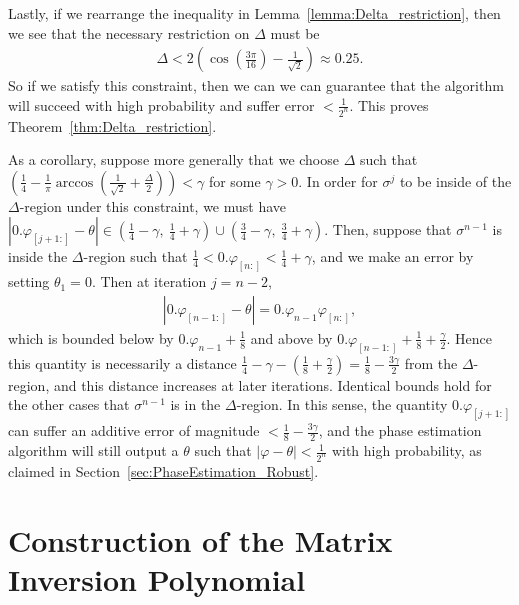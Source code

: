 \documentclass[aps,pra,showpacs,notitlepage,twocolumn,superscriptaddress,nofootinbib]{revtex4-1}
\begin{document}
Lastly, if we rearrange the inequality in Lemma~\ref{lemma:Delta_restriction}, then we see that the necessary restriction on $\Delta$ must be 
\begin{equation}
\begin{gathered}
    \Delta < 2\left(\cos(\frac{3\pi}{16}) - \frac{1}{\sqrt{2}} \right) \approx 0.25.
\end{gathered}
\end{equation}
So if we satisfy this constraint, then we can we can guarantee that the algorithm will succeed with high probability and suffer error $< \frac{1}{2^n}$. This proves Theorem~\ref{thm:Delta_restriction}.


As a corollary, suppose more generally that we choose $\Delta$ such that $\left( \frac{1}{4} - \frac{1}{\pi}\arccos( \frac{1}{\sqrt{2}} + \frac{\Delta}{2}) \right) < \gamma$ for some $\gamma>0$. In order for $\sigma^j$ to be inside of the $\Delta$-region under this constraint, we must have $|0.\varphi_{[j+1:]} - \theta| \in (\frac{1}{4} - \gamma,\ \frac{1}{4} + \gamma ) \cup (\frac{3}{4} - \gamma,\ \frac{3}{4} + \gamma )$. Then, suppose that $\sigma^{n-1}$ is inside the $\Delta$-region such that $\frac{1}{4} < 0.\varphi_{[n:]} <\frac{1}{4} + \gamma$, and we make an error by setting $\theta_1 = 0$. Then at iteration $j=n-2$, 
\begin{equation}
\begin{gathered}
    |0.\varphi_{[n-1:]} - \theta| = 0.\varphi_{n-1}\varphi_{[n:]}, 
\end{gathered}
\end{equation}
which is bounded below by $0.\varphi_{n-1} + \frac{1}{8}$ and above by $0.\varphi_{[n-1:]} + \frac{1}{8} +  \frac{\gamma}{2}$. Hence this quantity is necessarily a distance $\frac{1}{4} - \gamma - (\frac{1}{8} +\frac{\gamma}{2}) = \frac{1}{8} - \frac{3\gamma}{2}$ from the $\Delta$-region, and this distance increases at later iterations. Identical bounds hold for the other cases that $\sigma^{n-1}$ is in the $\Delta$-region. In this sense, the quantity $0.\varphi_{[j+1:]}$ can suffer an additive error of magnitude $<\frac{1}{8} - \frac{3\gamma}{2}$, and the phase estimation algorithm will still output a $\theta$ such that $|\varphi - \theta| < \frac{1}{2^n}$ with high probability, as claimed in Section~\ref{sec:PhaseEstimation_Robust}. 




\section{Construction of the Matrix Inversion Polynomial}\label{sec:matrix_inversion_polynomial}
\end{document}
